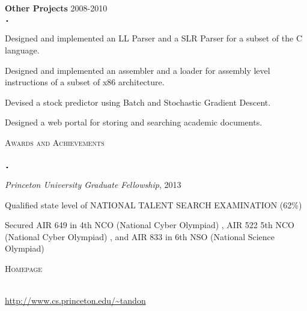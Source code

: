 \documentclass{article}
\newcommand{\sbt}{\,\begin{picture}(-1,1)(-1,-3)\circle*{2}\end{picture}\ }
\newcommand{\lineunder}{\vspace*{-8pt} \\ \hspace*{-18pt} \hrulefill \\}
\newcommand{\header}[1]{{\hspace*{-15pt}\vspace*{6pt} \textsc{#1}} \vspace*{-6pt} \lineunder}
\newcommand{\project}[2]{{ \textbf{#1} \hfill #2\\  }}
\newenvironment{achievements}{\begin{list}{$\sbt$}{\topsep -2pt \itemsep -2pt}}{\vspace*{0pt}\end{list}}
\begin{document}
\project{Other Projects}{2008-2010}
	\begin{achievements}
	\item Designed and implemented an LL Parser and a SLR Parser for a subset of the C language.
	\item Designed and implemented an assembler and a loader for assembly level instructions of a subset of x86 architecture.
	\item Devised a stock predictor using Batch and Stochastic Gradient Descent.
	\item Designed a web portal for storing and searching academic documents.
	\end{achievements}
\vspace{3mm} 

\header{Awards and Achievements}
\begin{achievements}
 \item \textit{Princeton University Graduate Fellowship}, 2013
 \item Qualified state level of NATIONAL TALENT SEARCH EXAMINATION (62$\%$)
 \item Secured AIR 649 in 4th NCO (National Cyber Olympiad) , AIR 522 5th NCO (National Cyber Olympiad) , and AIR 833 in 6th NSO (National Science Olympiad)
\end{achievements}
\vspace{3mm} 
\header{Homepage}
\begin{centering} 
 \url{http://www.cs.princeton.edu/~tandon}
\end{centering}
\end{document}
